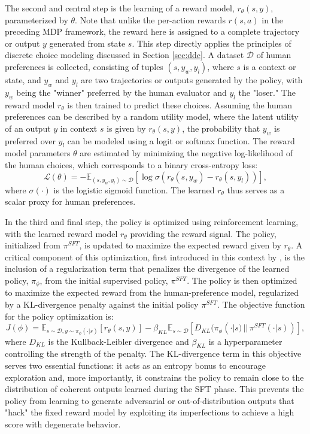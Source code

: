 The second and central step is the learning of a reward model, $r_\theta(s, y)$, parameterized by $\theta$. Note that unlike the per-action rewards $r(s,a)$ in the preceding MDP framework, the reward here is assigned to a complete trajectory or output $y$ generated from state $s$. This step directly applies the principles of discrete choice modeling discussed in Section \ref{sec:ddc}. A dataset $\mathcal{D}$ of human preferences is collected, consisting of tuples $(s, y_w, y_l)$, where $s$ is a context or state, and $y_w$ and $y_l$ are two trajectories or outputs generated by the policy, with $y_w$ being the "winner" preferred by the human evaluator and $y_l$ the "loser." The reward model $r_\theta$ is then trained to predict these choices. Assuming the human preferences can be described by a random utility model, where the latent utility of an output $y$ in context $s$ is given by $r_\theta(s, y)$, the probability that $y_w$ is preferred over $y_l$ can be modeled using a logit or softmax function. The reward model parameters $\theta$ are estimated by minimizing the negative log-likelihood of the human choices, which corresponds to a binary cross-entropy loss:
\begin{equation}
    \mathcal{L}(\theta) = -\mathbb{E}_{(s, y_w, y_l) \sim \mathcal{D}} \left[ \log \sigma \left( r_\theta(s, y_w) - r_\theta(s, y_l) \right) \right],
\label{eq:rlhf_loss}
\end{equation}
where $\sigma(\cdot)$ is the logistic sigmoid function. The learned $r_\theta$ thus serves as a scalar proxy for human preferences.

In the third and final step, the policy is optimized using reinforcement learning, with the learned reward model $r_\theta$ providing the reward signal. The policy, initialized from $\pi^{SFT}$, is updated to maximize the expected reward given by $r_\theta$. A critical component of this optimization, first introduced in this context by \citet{ziegler2019fine}, is the inclusion of a regularization term that penalizes the divergence of the learned policy, $\pi_\phi$, from the initial supervised policy, $\pi^{SFT}$. The policy is then optimized to maximize the expected reward from the human-preference model, regularized by a KL-divergence penalty against the initial policy $\pi^{SFT}$. The objective function for the policy optimization is:
\begin{equation}
    J(\phi) = \mathbb{E}_{s \sim \mathcal{D}, y \sim \pi_\phi(\cdot|s)} [r_\theta(s, y)] - \beta_{KL} \mathbb{E}_{s \sim \mathcal{D}} [D_{KL}(\pi_\phi(\cdot|s) \,||\, \pi^{SFT}(\cdot|s))],
\label{eq:rlhf_objective}
\end{equation}
where $D_{KL}$ is the Kullback-Leibler divergence and $\beta_{KL}$ is a hyperparameter controlling the strength of the penalty. The KL-divergence term in this objective serves two essential functions: it acts as an entropy bonus to encourage exploration and, more importantly, it constrains the policy to remain close to the distribution of coherent outputs learned during the SFT phase. This prevents the policy from learning to generate adversarial or out-of-distribution outputs that "hack" the fixed reward model by exploiting its imperfections to achieve a high score with degenerate behavior.

